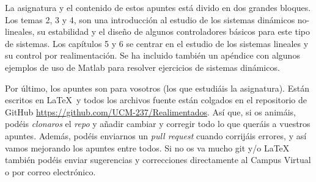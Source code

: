 La asignatura y el contenido de estos apuntes está divido en dos grandes bloques. Los temas 2, 3 y 4, son una introducción al estudio de los sistemas dinámicos no-lineales, su estabilidad y el diseño de algunos controladores básicos para este tipo de sistemas. Los capítulos 5 y 6 se centrar en el estudio de los sistemas lineales y su control por realimentación.  Se ha incluido también un apéndice con algunos ejemplos de uso de Matlab para resolver ejercicios de sistemas dinámicos.

Por último, los apuntes son para vosotros (los que estudiáis la asignatura). Están escritos en \LaTeX\ y todos los archivos fuente están colgados en el repositorio de GitHub \url{https://github.com/UCM-237/Realimentados}. Así que, si os animáis, podéis \emph{clonaros} el \emph{repo} y añadir cambiar y corregir todo lo que queráis a vuestros apuntes. Además, podéis enviarnos un \emph{pull request} cuando corrijáis errores, y así vamos mejorando los apuntes entre todos. Si no os va mucho git y/o \LaTeX\, también podéis enviar sugerencias y correcciones directamente al Campus Virtual o por correo electrónico.


